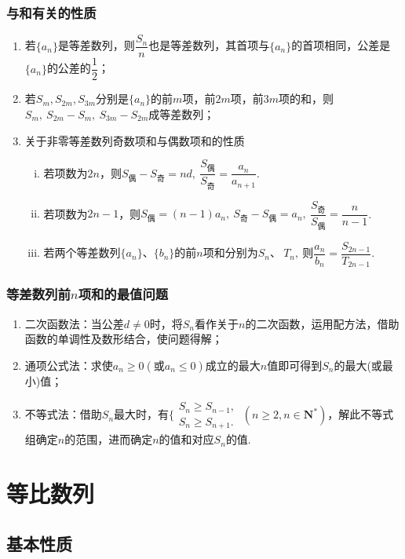 \documentclass{BHCexam}
\begin{document}
\subsubsection{与和有关的性质}
\begin{enumerate}[(1)]
\item 若$\{a_n\}$是等差数列，则$ \dfrac{S_n}{n} $也是等差数列，其首项与$ \{a_n\} $的首项相同，公差是$\{a_n\}$的公差的$ \dfrac{1}{2} $；
\item 若$ S_m,S_{2m},S_{3m} $分别是$\{a_n\}$的前$ m $项，前$ 2m $项，前$ 3m $项的和，则$ S_m,~S_{2m}-S_m,~S_{3m}-S_{2m} $成等差数列；
\item 关于非零等差数列奇数项和与偶数项和的性质\begin{enumerate}[i)]
\item 若项数为$ 2n $，则$ S_{\text{偶}}-S_{\text{奇}}=nd ,~\dfrac{S_{\text{偶}}}{S_{\text{奇}}}=\dfrac{a_n}{a_{n+1}}$.
\item 若项数为$ 2n-1 $，则$  S_{\text{偶}}=(n-1)a_n,~S_{\text{奇}}-S_{\text{偶}}=a_n,~\dfrac{S_{\text{奇}}}{S_{\text{偶}}}=\dfrac{n}{n-1}$.
\item 若两个等差数列$\{a_n\}$、$\{b_n\}$的前$ n $项和分别为$ S_n\text{、}~T_n,~ $则$ \dfrac{a_n}{b_n}=\dfrac{S_{2n-1}}{T_{2n-1}} $.
\end{enumerate}
\end{enumerate}
\subsubsection{等差数列前$ n $项和的最值问题}
\begin{enumerate}[1)]
\item 二次函数法：当公差$d\ne0$时，将$ S_n $看作关于$ n $的二次函数，运用配方法，借助函数的单调性及数形结合，使问题得解；
\item 通项公式法：求使$ a_n\ge0 \left(\text{或}a_n\le0\right)$成立的最大$ n $值即可得到$ S_n $的最大(或最小)值；
\item 不等式法：借助$ S_n $最大时，有$\Bigg\{\begin{aligned}
S_n\ge S_{n-1},\\
S_n\ge S_{n+1}.
\end{aligned}~(n\ge2,n\in\mathbf{N^*})$，解此不等式组确定$ n $的范围，进而确定$ n $的值和对应$ S_n $的值.
\end{enumerate}
\section{等比数列}
\subsection{基本性质}
\end{document}
